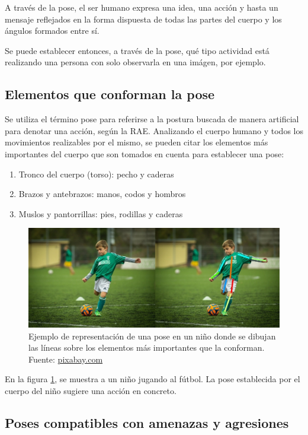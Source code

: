 \documentclass[a4paper,12pt,oneside,spanish]{book}
\begin{document}
A través de la pose, el ser humano expresa una idea, una acción y hasta un mensaje reflejados en la forma dispuesta de todas las partes del cuerpo y los ángulos formados entre sí. \par

Se puede establecer entonces, a través de la pose, qué tipo actividad está realizando una persona con solo observarla en una imágen, por ejemplo. \par

\subsection{Elementos que conforman la pose}
Se utiliza el término pose para referirse a la postura buscada de manera artificial para denotar una acción, según la RAE. Analizando el cuerpo humano y todos los movimientos realizables por el mismo, se pueden citar los elementos más importantes del cuerpo que son tomados en cuenta para establecer una pose: 
\begin{enumerate}
	\baselineskip 16pt
	\item Tronco del cuerpo (torso): pecho y caderas  
	\item Brazos y antebrazos: manos, codos y hombros  
	\item Muslos y pantorrillas: pies, rodillas y caderas
\end{enumerate}

\begin{figure}[h!]
	\includegraphics[width=350pt]{Imagenes/pose1.jpg}
	\centering
	\caption{Ejemplo de representación de una pose en un niño donde  se dibujan las líneas sobre los elementos más importantes que la conforman. Fuente: \url{pixabay.com}}
	\label{fig:pose1}
\end{figure}

En la figura \ref{fig:pose1}, se muestra a un niño jugando al fútbol. La pose establecida por el cuerpo del niño sugiere una acción en concreto. \par

\subsection{Poses compatibles con amenazas y agresiones}
\end{document}
